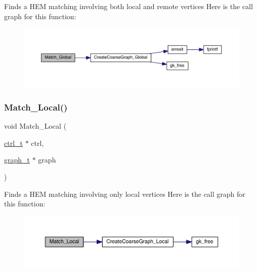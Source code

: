 Finds a H\+EM matching involving both local and remote vertices Here is the call graph for this function\+:\nopagebreak
\begin{figure}[H]
\begin{center}
\leavevmode
\includegraphics[width=350pt]{a00368_ad37d00e4c0b7fb71a6778c5bf86d4d02_cgraph}
\end{center}
\end{figure}
\mbox{\label{a00368_a46eecf02147d0406cc05ec7e3839169b}} 
\subsubsection{\texorpdfstring{Match\+\_\+\+Local()}{Match\_Local()}}
{\footnotesize\ttfamily void Match\+\_\+\+Local (\begin{DoxyParamCaption}\item[{\hyperlink{a00742}{ctrl\+\_\+t} $\ast$}]{ctrl,  }\item[{\hyperlink{a00734}{graph\+\_\+t} $\ast$}]{graph }\end{DoxyParamCaption})}

Finds a H\+EM matching involving only local vertices Here is the call graph for this function\+:\nopagebreak
\begin{figure}[H]
\begin{center}
\leavevmode
\includegraphics[width=350pt]{a00368_a46eecf02147d0406cc05ec7e3839169b_cgraph}
\end{center}
\end{figure}
